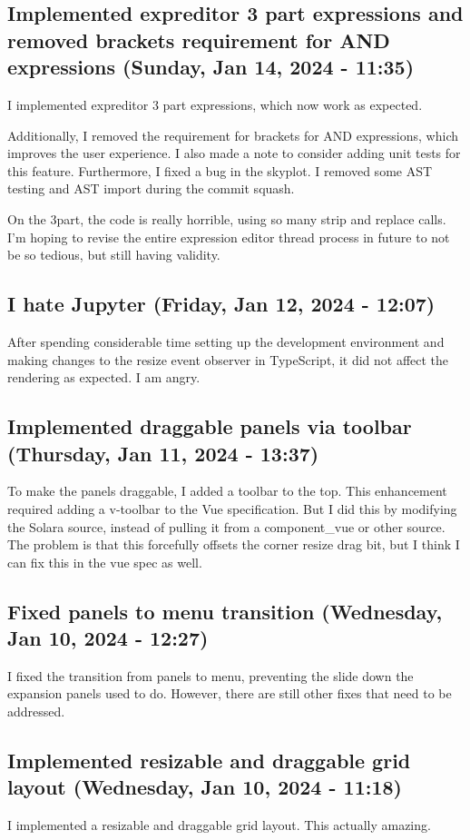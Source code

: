 \documentclass[a4paper]{article}
\begin{document}
\subsection*{Implemented expreditor 3 part expressions and removed brackets requirement for AND expressions (Sunday, Jan 14, 2024 - 11:35)}
I implemented expreditor 3 part expressions, which now work as expected.

Additionally, I removed the requirement for brackets for AND expressions, which improves the user experience. I also made a note to consider adding unit tests for this feature. Furthermore, I fixed a bug in the skyplot. I removed some AST testing and AST import during the commit squash.

On the 3part, the code is really horrible, using so many strip and replace calls. I'm hoping to revise the entire expression editor thread process in future to not be so tedious, but still having validity.

\subsection*{I hate Jupyter (Friday, Jan 12, 2024 - 12:07)}
After spending considerable time setting up the development environment and making changes to the resize event observer in TypeScript, it did not affect the rendering as expected. I am angry.

\subsection*{Implemented draggable panels via toolbar (Thursday, Jan 11, 2024 - 13:37)}
To make the panels draggable, I added a toolbar to the top. This enhancement required adding a v-toolbar to the Vue specification. But I did this by modifying the Solara source, instead of pulling it from a component\_vue or other source. The problem is that this forcefully offsets the corner resize drag bit, but I think I can fix this in the vue spec as well.

\subsection*{Fixed panels to menu transition (Wednesday, Jan 10, 2024 - 12:27)}
I fixed the transition from panels to menu, preventing the slide down the expansion panels used to do. However, there are still other fixes that need to be addressed.

\subsection*{Implemented resizable and draggable grid layout (Wednesday, Jan 10, 2024 - 11:18)}
I implemented a resizable and draggable grid layout. This actually amazing.
\end{document}
